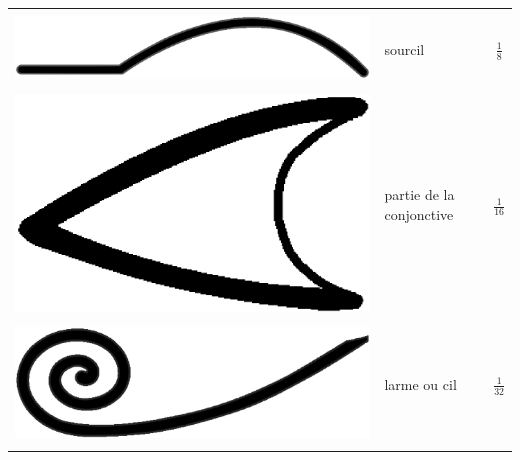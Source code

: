 \documentclass[letterpaper, 12pt]{article}
\begin{document}
\begin{center}
\begin{tabular}{|c|l|c|}
& & \\
\includegraphics[scale=0.1]{sourcil.eps} & sourcil & {\Large$\frac{1}{8}$}\\[2mm] \hline
& & \\
\includegraphics[scale=0.1]{conjonctive16.eps} & partie de la conjonctive & {\Large$\frac{1}{16}$}\\[2mm] \hline
& & \\
\includegraphics[scale=0.1]{larme.eps} & larme ou cil & {\Large$\frac{1}{32}$}\\[2mm] \hline
& & \\

\end{tabular}
\end{center}
\end{document}
